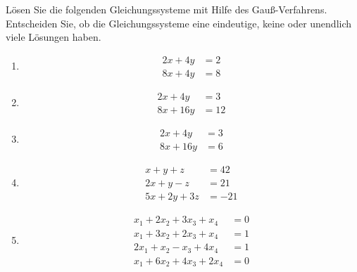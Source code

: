 \begin{ExerciseBlock}
\setlength{\abovedisplayskip}{6pt}
\setlength{\belowdisplayskip}{6pt}
\setlength{\abovedisplayshortskip}{3pt}
\setlength{\belowdisplayshortskip}{3pt}
Lösen Sie die folgenden Gleichungssysteme mit Hilfe des Gauß-Verfahrens. Entscheiden Sie, ob die Gleichungssysteme eine eindeutige, keine oder unendlich viele Lösungen haben.
\begin{enumerate}[label=\alph*),itemsep=0pt,parsep=0pt,topsep=0pt]
	\item 
	\begin{equation*}
	\begin{split}
		2x + 4y  &= 2 \\
 		8x + 4y &= 8
	\end{split}
	\end{equation*}

	\item 
	\begin{equation*}
	\begin{split}
		2x + 4y  &= 3 \\
 		8x + 16y &= 12
	\end{split}
	\end{equation*}

	\item 
	\begin{equation*}
	\begin{split}
		2x + 4y  &= 3 \\
 		8x + 16y &= 6
	\end{split}
	\end{equation*}

	\item 
	\begin{equation*}
	\begin{split}
		x + y + z &= 42 \\
 		2x+y-z &= 21 \\
 		5x+2y+3z &= -21
	\end{split}
	\end{equation*}

	\item 
	\begin{equation*}
	\begin{split}
		x_1 + 2 x_2 + 3 x_3 + x_4 &= 0 \\
 		x_1 + 3 x_2 + 2 x_3 + x_4 &= 1 \\
 		2x_1 +  x_2 - x_3 + 4 x_4 &= 1 \\
 		x_1 + 6 x_2 + 4 x_3 + 2 x_4 &= 0
	\end{split}
	\end{equation*}


\end{enumerate}
\end{ExerciseBlock}

